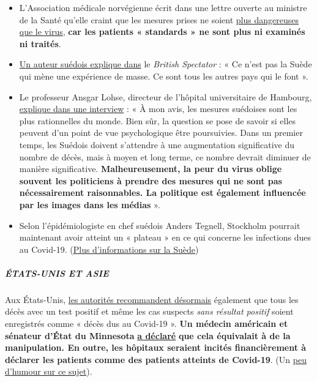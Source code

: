\begin{itemize}
\tightlist
\item
  L'Association médicale norvégienne écrit dans une lettre ouverte au
  ministre de la Santé qu'elle craint que les mesures prises ne soient
  \href{https://www.abcnyheter.no/helse-og-livsstil/helse/2020/04/06/195667780/nesten-halvparten-av-sengene-pa-oslo-universitetssykehus-star-tomme}{plus
  dangereuses que le virus}, \textbf{car les patients « standards » ne
  sont plus ni examinés ni traités}.
\item
  \href{https://www.spectator.co.uk/article/no-lockdown-please-w-re-swedish}{Un
  auteur suédois explique dans} le \emph{British Spectator} : « Ce n'est
  pas la Suède qui mène une expérience de masse. Ce sont tous les autres
  pays qui le font ».
\item
  Le professeur Ansgar Lohse, directeur de l'hôpital universitaire de
  Hambourg,
  \href{https://www.abendblatt.de/hamburg/article228880917/uke-professor-shutdown-lohse-deutschland-hamburg-corona-virus-infektion-covid-19-impfstoff-coronavirus-krise-patienten-immunitaet-krankenhaeuser-kontaktverbot-kliniken-infektionsrate.html}{explique
  dans une interview} : « À mon avis, les mesures suédoises sont les
  plus rationnelles du monde. Bien sûr, la question se pose de savoir si
  elles peuvent d'un point de vue psychologique être poursuivies. Dans
  un premier temps, les Suédois doivent s'attendre à une augmentation
  significative du nombre de décès, mais à moyen et long terme, ce
  nombre devrait diminuer de manière significative.
  \textbf{Malheureusement, la peur du virus oblige souvent les
  politiciens à prendre des mesures qui ne sont pas nécessairement
  raisonnables. La politique est également influencée par les images
  dans les médias} ».
\item
  Selon l'épidémiologiste en chef suédois Anders Tegnell, Stockholm
  pourrait maintenant avoir atteint un « plateau » en ce qui concerne
  les infections dues au Covid-19.
  (\href{https://www.thelocal.se/20200310/timeline-how-the-coronavirus-has-developed-in-sweden}{Plus
  d'informations sur la Suède})
\end{itemize}

\hypertarget{uxe9tats-unis-et-asie}{%
\subparagraph{\texorpdfstring{\textbf{ÉTATS-UNIS ET
ASIE}}{ÉTATS-UNIS ET ASIE}}\label{uxe9tats-unis-et-asie}}

Aux États-Unis,
\href{https://nypost.com/2020/04/07/feds-classify-all-coronavirus-patient-deaths-as-covid-19-deaths/?link=TD_mansionglobal_new_mansion_global.11147f181987fd93}{les
autorités recommandent désormais} également que tous les décès avec un
test positif et même les cas suspects \emph{sans résultat positif}
soient enregistrés comme « décès dus au Covid-19 ». \textbf{Un médecin
américain et sénateur d'État du Minnesota}
\href{https://www.valleynewslive.com/content/misc/Sen-Dr-Jensens-Shocking-Admission-About-Coronavirus-569458361.html}{\textbf{a
déclaré}} \textbf{que cela équivalait à de la manipulation. En outre,
les hôpitaux seraient incités financièrement à déclarer les patients
comme des patients atteints de Covid-19}. (Un
\href{https://swprs.files.wordpress.com/2020/04/cv-2019-2020.jpg}{peu
d'humour sur ce sujet}).

